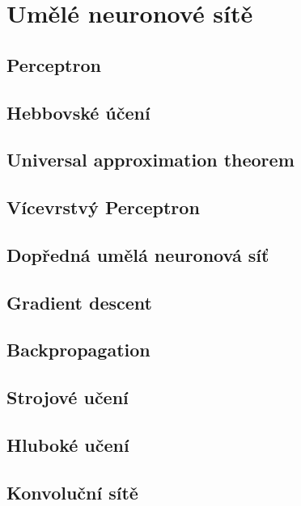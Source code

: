 \section{Umělé neuronové sítě}
\subsection{Perceptron}
\subsection{Hebbovské účení}
\subsection{Universal approximation theorem}
\label{sec:universal_approximation_theorem}

\subsection{Vícevrstvý Perceptron}
\label{sec:multilayer_perceptron}

\subsection{Dopředná umělá neuronová síť}
\label{sec:feedforward_nn}
\subsection{Gradient descent}
\label{sec:gradient_descent}
\subsection{Backpropagation}
\subsection{Strojové učení}
\label{sec:machine_learning}
\subsection{Hluboké učení}
\label{sec:deep_learning}
\subsection{Konvoluční sítě}
\label{sec:cnn}

